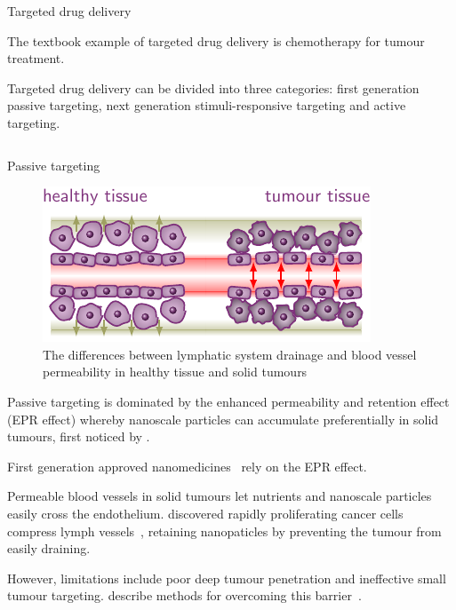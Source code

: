 \documentclass[final]{beamer}
\begin{document}
\begin{frame}[plain]
\begin{columns}[t,onlytextwidth]
\begin{block}{Targeted drug delivery\strut}
        The textbook example of targeted drug delivery is chemotherapy for tumour treatment.

        Targeted drug delivery can be divided into three categories: first generation \alert{passive targeting}, next generation \alert{stimuli-responsive targeting} and \alert{active targeting}.

      \end{block}

  \end{columns}

  \begin{columns}[t,onlytextwidth]
      \begin{block}{Passive targeting\strut}

        \begin{figure}
          \centering
          \includegraphics[scale=2.4]{tikz/epr_effect.pdf}
          \caption{The differences between \textcolor{gold-palatinate}{lymphatic system} drainage and \textcolor{red!80}{blood vessel} permeability in healthy tissue and solid tumours}
          \label{fig:epr}
        \end{figure}

        Passive targeting is dominated by the \alert{enhanced permeability and retention effect} (EPR effect) whereby nanoscale particles can accumulate preferentially in solid tumours, first noticed by \textcite{maeda2000tumor}.

        First generation approved nanomedicines~\cite{wicki2015nanomedicine} rely on the EPR effect.
        
        \alert{Permeable blood vessels} in solid tumours let nutrients and nanoscale particles easily cross the endothelium. \citeauthor{padera2004pathology} discovered rapidly proliferating cancer cells \alert{compress lymph vessels}~\cite{padera2004pathology}, retaining nanopaticles by preventing the tumour from easily draining.

        However, limitations include \alert{poor deep tumour penetration} and \alert{ineffective small tumour targeting}. \citeauthor{jain2010delivering} describe methods for overcoming this barrier~\cite{jain2010delivering}.


\end{block}
\end{columns}
\end{frame}
\end{document}
